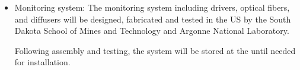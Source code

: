 \begin{itemize}
\item Monitoring system: The monitoring system including  drivers, optical fibers, and diffusers will be designed, fabricated and tested in the US by the South Dakota School of Mines and Technology and Argonne National Laboratory. 

Following assembly and testing, the system will be stored at the  until needed for installation.

\end{itemize}

